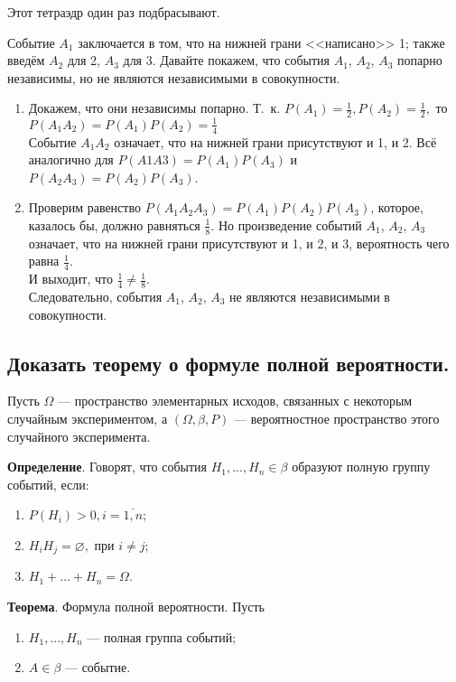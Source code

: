 Этот тетраэдр один раз подбрасывают.

Событие $A_1$ заключается в том, что на нижней грани <<написано>> 1; также введём $A_2$ для 2, $A_3$ для 3. Давайте покажем, что события $A_1$, $A_2$, $A_3$ попарно независимы, но не являются независимыми в совокупности.

\begin{enumerate}
	\item Докажем, что они независимы попарно. Т.~к. $P(A_1) = \frac{1}{2}, P(A_2) = \frac{1}{2}, $ то $P(A_1A_2) = P(A_1)P(A_2) = \frac{1}{4}$\\
	Событие $A_1A_2$ означает, что на нижней грани присутствуют и 1, и 2. Всё аналогично для $P(A1A3) = P(A_1)P(A_3)$ и $P(A_2A_3) = P(A_2)P(A_3)$.
	\item Проверим равенство $P(A_1A_2A_3) = P(A_1)P(A_2)P(A_3)$, которое, казалось бы, должно равняться $\frac{1}{8}$. Но произведение событий $A_1$, $A_2$, $A_3$ означает, что на
	нижней грани присутствуют и 1, и 2, и 3, вероятность чего равна $\frac{1}{4}$.\\
	И выходит, что $\frac{1}{4} \neq \frac{1}{8}$.\\
	Следовательно, события $A_1$, $A_2$, $A_3$ не являются независимыми в совокупности.
\end{enumerate}

\subsection{Доказать теорему о формуле полной вероятности.}

Пусть $\Omega$ — пространство элементарных исходов, связанных с некоторым случайным экспериментом, а $(\Omega, \beta, P)$ --- вероятностное пространство этого случайного эксперимента.

\textbf{Определение}. Говорят, что события $H_{1}, ..., H_{n} \in \beta$ образуют полную группу событий, если:
\begin{enumerate}
	\item $P(H_{i}) > 0, i = \overline{1, n}$;
	\item $H_{i} H_{j} = \varnothing, \text{ при } i \neq j$;
	\item $H_{1} + ... + H_{n} = \Omega$.
\end{enumerate}

\textbf{Теорема}. Формула полной вероятности. Пусть
\begin{enumerate}
	\item $H_{1}, ..., H_{n}$ --- полная группа событий;
	\item $A \in \beta$ --- событие.
\end{enumerate}

